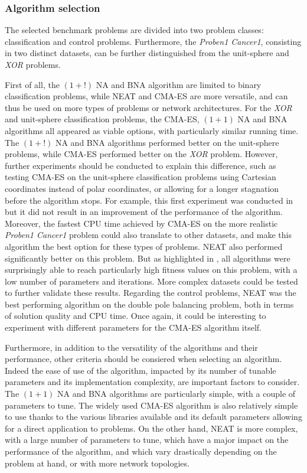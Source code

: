 \subsubsection{Algorithm selection}

The selected benchmark problems are divided into two problem classes: classification and control problems. Furthermore, the \textit{Proben1 Cancer1}, consisting in two distinct datasets,
can be further distinguished from the unit-sphere and \textit{XOR} problems.

First of all, the $(1 + !)$ NA and BNA algorithm are limited to binary classification problems, while NEAT and CMA-ES are more versatile, and can thus be used on more types of problems or
network architectures. For the \textit{XOR} and unit-sphere classification problems, the CMA-ES, $(1 + 1)$ NA and BNA algorithms all appeared as viable options, with particularly similar running time.
The $(1 + !)$ NA and BNA algorithms performed better on the unit-sphere problems, while CMA-ES performed better on the \textit{XOR} problem.
However, further experiments should be conducted to explain this difference, such as testing CMA-ES on the unit-sphere classification problems using Cartesian coordinates instead of polar coordinates,
or allowing for a longer stagnation before the algorithm stops.
For example, this first experiment was conducted in \cite{na} but it did not result in an improvement of the performance of the algorithm.
Moreover, the fastest CPU time achieved by CMA-ES on the more realistic \textit{Proben1 Cancer1} problem could also translate to other datasets, and make this algorithm the best option for
these types of problems. NEAT also performed significantly better on this problem. But as highlighted in , all algorithms were surprisingly able to reach particularly high fitness
values on this problem, with a low number of parameters and iterations. More complex datasets could be tested to further validate these results.
Regarding the control problems, NEAT was the best performing algorithm on the double pole balancing problem, both in terms of solution quality and CPU time. Once again, it could be interesting to
experiment with different parameters for the CMA-ES algorithm itself.

Furthermore, in addition to the versatility of the algorithms and their performance, other criteria should be consiered when selecting an algorithm. Indeed the ease of use of the algorithm,
impacted by its number of tunable parameters and its implementation complexity, are important factors to consider. The $(1 + 1)$ NA and BNA algorithms are particularly simple, with a couple
of parameters to tune. The widely used CMA-ES algorithm is also relatively simple to use thanks to the various libraries available and its default parameters allowing for a direct
application to problems. On the other hand, NEAT is more complex, with a large number of parameters to tune, which have a major impact on the performance of the algorithm, and which
vary drastically depending on the problem at hand, or with more network topologies.

